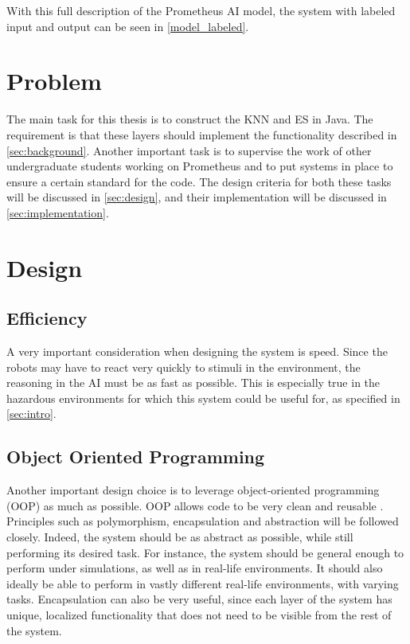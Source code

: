 \documentclass[titlepage,11pt]{article}
\begin{document}
With this full description of the Prometheus AI model, the system with labeled input and output can be seen in \autoref{model_labeled}.

\section{Problem}
\label{sec:problem}

The main task for this thesis is to construct the KNN and ES in Java. The requirement is that these layers should implement the functionality described in \autoref{sec:background}. Another important task is to supervise the work of other undergraduate students working on Prometheus and to put systems in place to ensure a certain standard for the code. The design criteria for both these tasks will be discussed in \autoref{sec:design}, and their implementation will be discussed in \cref{sec:implementation}.

\section{Design}
\label{sec:design}

\subsection{Efficiency}
A very important consideration when designing the system is speed. Since the robots may have to react very quickly to stimuli in the environment, the reasoning in the AI must be as fast as possible. This is especially true in the hazardous environments for which this system could be useful for, as specified in \autoref{sec:intro}.

\subsection{Object Oriented Programming}
Another important design choice is to leverage object-oriented programming (OOP) as much as possible. OOP allows code to be very clean and reusable \cite{oop}. Principles such as polymorphism, encapsulation and abstraction will be followed closely. Indeed, the system should be as abstract as possible, while still performing its desired task. For instance, the system should be general enough to perform under simulations, as well as in real-life environments. It should also ideally be able to perform in vastly different real-life environments, with varying tasks. Encapsulation can also be very useful, since each layer of the system has unique, localized functionality that does not need to be visible from the rest of the system.
\end{document}
